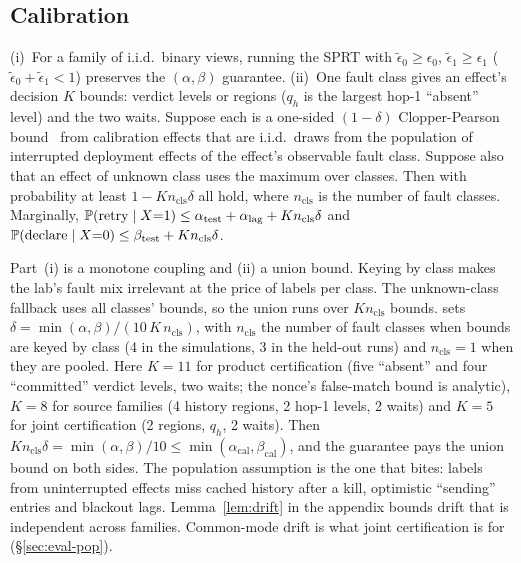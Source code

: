 \subsection{Calibration}
\label{sec:theory-cal}
\begin{lemma}
\label{lem:calib}
(i)~For a family of i.i.d.\ binary views, running the SPRT with $\tilde\epsilon_0\ge\epsilon_0$, $\tilde\epsilon_1\ge\epsilon_1$ ($\tilde\epsilon_0+\tilde\epsilon_1<1$) preserves the
$(\alpha,\beta)$ guarantee.
(ii)~One fault class gives an effect's decision $K$ bounds: verdict levels or regions ($q_h$ is the largest hop-1 ``absent'' level) and the two waits. Suppose each is a one-sided $(1-\delta)$ Clopper-Pearson
bound~\cite{clopper1934use} from calibration effects that are i.i.d.\ draws from the population of interrupted deployment effects of the effect's observable fault
class. Suppose also that an effect of unknown class uses the maximum over classes. Then with probability
at least $1-Kn_{\mathrm{cls}}\delta$ all hold, where $n_{\mathrm{cls}}$ is the number of fault classes. Marginally, $\mathbb{P}(\text{retry}\mid X{=}1)\le\alpha_{\mathrm{test}}+\alpha_{\mathrm{lag}}+Kn_{\mathrm{cls}}\delta$ and $\mathbb{P}(\text{declare}\mid X{=}0)\le\beta_{\mathrm{test}}+Kn_{\mathrm{cls}}\delta$.
\end{lemma}
Part~(i) is a monotone coupling and (ii) a union bound. Keying by class makes the lab's fault mix irrelevant at the price of labels per class. The unknown-class fallback
uses all classes' bounds, so the union runs over $Kn_{\mathrm{cls}}$ bounds. \sys sets $\delta=\min(\alpha,\beta)/(10\,K\,n_{\mathrm{cls}})$, with $n_{\mathrm{cls}}$ the number of fault classes when bounds are keyed by class (4 in the simulations, 3 in the held-out runs) and $n_{\mathrm{cls}}{=}1$ when they are pooled.
Here $K{=}11$ for product certification (five ``absent'' and four ``committed'' verdict levels, two waits; the nonce's false-match bound is analytic), $K{=}8$ for source
families (4 history regions, 2 hop-1 levels, 2 waits) and $K{=}5$ for joint certification (2 regions, $q_h$, 2 waits). Then $Kn_{\mathrm{cls}}\delta=\min(\alpha,\beta)/10\le\min(\alpha_{\mathrm{cal}},\beta_{\mathrm{cal}})$, and the guarantee pays the union bound on both sides.
The population assumption is the one that bites: labels from uninterrupted effects miss cached history after a kill, optimistic ``sending'' entries and blackout lags.
Lemma~\ref{lem:drift} in the appendix bounds drift that is independent across families. Common-mode drift is what joint certification is for (\S\ref{sec:eval-pop}).

